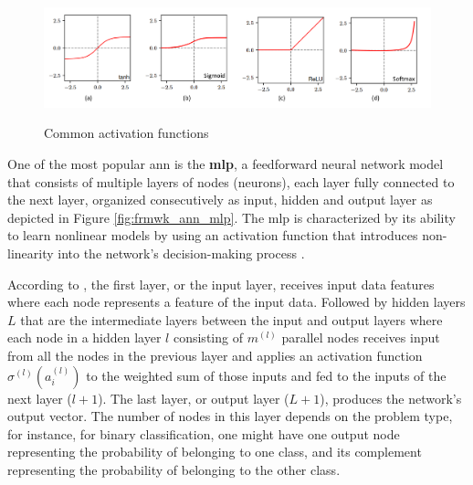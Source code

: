 \begin{figure}[htbp]
    \raggedright
        \caption{Common activation functions}
        \includegraphics[width=.9\textwidth]{resources/images/030-theoretical_framework/Framework_ann_activation_function.png}
        \label{fig:frmwk_ann_activation_functions}
\end{figure}

One of the most popular \gls{ann} is the \textbf{\gls{mlp}}, a feedforward neural network model that consists of multiple layers of nodes (neurons), each layer fully connected to the next layer, organized consecutively as input, hidden and output layer as depicted in Figure \ref{fig:frmwk_ann_mlp}. The \gls{mlp} is characterized by its ability to learn nonlinear models by using an activation function that introduces non-linearity into the network's decision-making process \cite{Mitchell1997}.

According to \textcite{Russel2010}, the first layer, or the input layer, receives input data features where each node represents a feature of the input data. Followed by hidden layers $L$ that are the intermediate layers between the input and output layers where each node in a hidden layer $l$ consisting of $m^{(l)}$ parallel nodes receives input from all the nodes in the previous layer and applies an activation function $\sigma^{(l)}(a_i^{(l)})$ to the weighted sum of those inputs and fed to the inputs of the next layer ($l+1$). The last layer, or output layer ($L+1$), produces the network's output vector. The number of nodes in this layer depends on the problem type, for instance, for binary classification, one might have one output node representing the probability of belonging to one class, and its complement representing the probability of belonging to the other class. %


